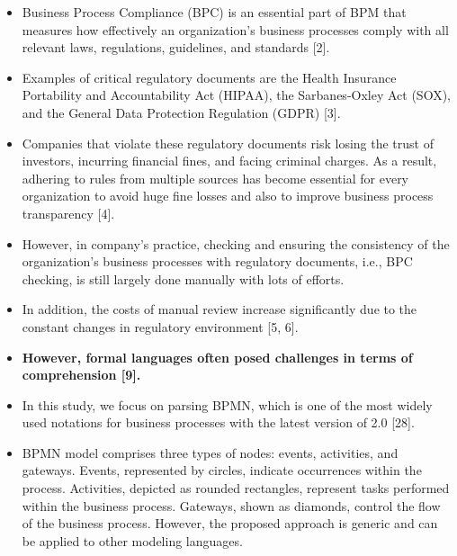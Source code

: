 \begin{itemize}
\item Business Process Compliance (BPC) is an essential part of BPM that measures how effectively an organization’s business processes comply with all relevant laws, regulations, guidelines, and standards [2].
\item Examples of critical regulatory documents are the Health Insurance Portability and Accountability Act (HIPAA), the Sarbanes-Oxley Act (SOX), and the General Data Protection Regulation (GDPR) [3]. 
\item Companies that violate these regulatory documents risk losing the trust of investors, incurring financial fines, and facing criminal charges. As a result, adhering to rules from multiple sources has become essential for every organization to avoid huge fine losses and also to improve business process transparency [4].
\item However, in company’s practice, checking and ensuring the consistency of the organization’s business processes with regulatory documents, i.e., BPC checking, is still largely done manually with lots of efforts.
\item In addition, the costs of manual review increase significantly due to the constant changes in regulatory environment [5, 6].
\item \textbf{However, formal languages often posed challenges in terms of comprehension [9].}
\item In this study, we focus on parsing BPMN, which is one of the most widely used notations for business processes with the latest version of 2.0 [28].
\item BPMN model comprises three types of nodes: events, activities, and gateways. Events, represented by circles, indicate occurrences within the process. Activities, depicted as rounded rectangles, represent tasks performed within the business process. Gateways, shown as diamonds, control the flow of the business process. However, the proposed approach is generic and can be applied to other modeling languages.
\end{itemize}






